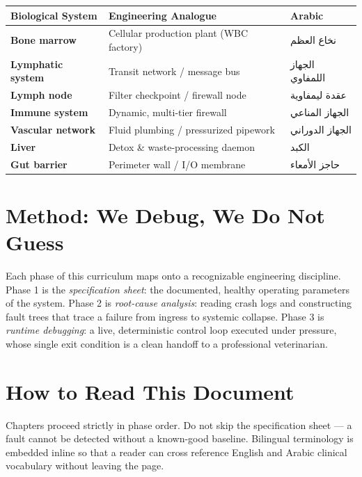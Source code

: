 \documentclass[12pt,oneside]{book}
\newcommand{\ar}[1]{\textarabic{#1}}
\begin{document}
\begin{center}
\renewcommand{\arraystretch}{1.35}
\begin{tabular}{>{\bfseries}l l l}
\toprule
\textbf{Biological System} & \textbf{Engineering Analogue} & \textbf{Arabic} \\
\midrule
Bone marrow      & Cellular production plant (WBC factory) & \ar{نخاع العظم} \\
Lymphatic system & Transit network / message bus           & \ar{الجهاز اللمفاوي} \\
Lymph node       & Filter checkpoint / firewall node        & \ar{عقدة ليمفاوية} \\
Immune system    & Dynamic, multi-tier firewall             & \ar{الجهاز المناعي} \\
Vascular network & Fluid plumbing / pressurized pipework     & \ar{الجهاز الدوراني} \\
Liver            & Detox \& waste-processing daemon          & \ar{الكبد} \\
Gut barrier      & Perimeter wall / I/O membrane             & \ar{حاجز الأمعاء} \\
\bottomrule
\end{tabular}
\end{center}

\section{Method: We Debug, We Do Not Guess}
Each phase of this curriculum maps onto a recognizable engineering
discipline. Phase 1 is the \emph{specification sheet}: the documented,
healthy operating parameters of the system. Phase 2 is \emph{root-cause
analysis}: reading crash logs and constructing fault trees that trace a
failure from ingress to systemic collapse. Phase 3 is \emph{runtime
debugging}: a live, deterministic control loop executed under pressure,
whose single exit condition is a clean handoff to a professional
veterinarian.

\section{How to Read This Document}
Chapters proceed strictly in phase order. Do not skip the specification
sheet --- a fault cannot be detected without a known-good baseline.
Bilingual terminology is embedded inline so that a reader can cross
reference English and Arabic clinical vocabulary without leaving the page.

\end{document}
